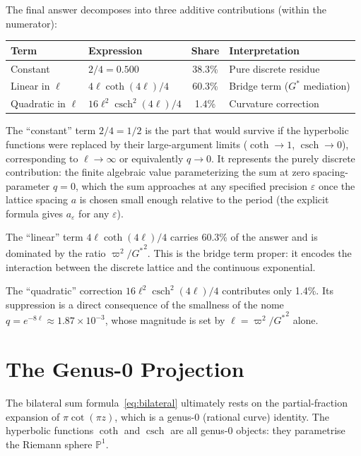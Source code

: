 \documentclass[12pt]{article}
\DeclareMathOperator{\csch}{csch}
\begin{document}
The final answer decomposes into three additive contributions (within the
numerator):

\medskip
\begin{center}
\begin{tabular}{llcl}
\toprule
\textbf{Term} & \textbf{Expression} & \textbf{Share} & \textbf{Interpretation}\\
\midrule
Constant    & $2/4=0.500$                   & 38.3\% & Pure discrete residue\\
Linear in $\ell$ & $4\ell\coth(4\ell)/4$  & 60.3\% & Bridge term (${G^{*}}$ mediation)\\
Quadratic in $\ell$ & $16\ell^2\csch^2(4\ell)/4$ & 1.4\% & Curvature correction\\
\bottomrule
\end{tabular}
\end{center}
\medskip

The ``constant'' term $2/4=1/2$ is the part that would survive if the
hyperbolic functions were replaced by their large-argument limits
($\coth\to 1$, $\csch\to 0$), corresponding to $\ell\to\infty$ or
equivalently $q\to 0$.  It represents the purely discrete contribution:
the finite algebraic value parameterizing the sum at zero spacing-parameter
$q = 0$, which the sum approaches at any specified precision $\varepsilon$
once the lattice spacing $a$ is chosen small enough relative to the period
(the explicit formula gives $a_{\varepsilon}$ for any $\varepsilon$).

The ``linear'' term $4\ell\coth(4\ell)/4$ carries 60.3\% of the
answer and is dominated by the ratio $\varpi^2/{G^{*}}^2$.  This is the
bridge term proper: it encodes the interaction between the discrete lattice
and the continuous exponential.

The ``quadratic'' correction $16\ell^2\csch^2(4\ell)/4$ contributes
only 1.4\%.  Its suppression is a direct consequence of the smallness of
the nome $q=e^{-8\ell}\approx 1.87\times 10^{-3}$, whose magnitude is
set by $\ell=\varpi^2/{G^{*}}^2$ alone.

\section{The Genus-0 Projection}\label{sec:genus}

The bilateral sum formula~\eqref{eq:bilateral} ultimately rests on the
partial-fraction expansion of $\pi\cot(\pi z)$, which is a genus-0
(rational curve) identity.  The hyperbolic functions $\coth$ and $\csch$
are all genus-0 objects: they parametrise the Riemann sphere $\mathbb{P}^1$.
\end{document}
